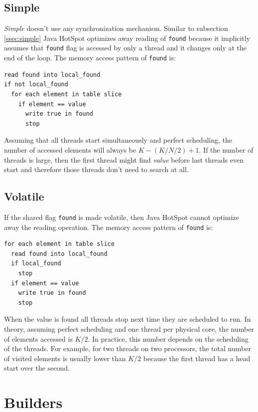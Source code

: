\documentclass[12pt]{article}
\begin{document}
\subsection{Simple}

\emph{Simple} doesn't use any synchronization mechanism. Similar to subsection
\ref{ssec:simple} Java HotSpot optimizes away reading of \texttt{found}
because it implicitly assumes that \texttt{found} flag is accessed by only
a thread and it changes only at the end of the loop. The memory access pattern
of \texttt{found} is:

\begin{verbatim}
read found into local_found
if not local_found
  for each element in table slice
    if element == value
      write true in found 
      stop
\end{verbatim}

Assuming that all threads start simultaneously and perfect scheduling, the
number of accessed elements will always be $K - (K / N / 2) + 1$. If
the number of threads is large, then the first thread might find \emph{value}
before last threads even start and therefore those threads don't need to
search at all.

\subsection{Volatile}

If the shared flag \texttt{found} is made volatile, then Java HotSpot
cannot optimize away the reading operation. The memory access pattern of
\texttt{found} is:

\begin{verbatim}
for each element in table slice
  read found into local_found
  if local_found
    stop
  if element == value
    write true in found 
    stop
\end{verbatim}

When the value is found all threads stop next time they are scheduled to
run. In theory, assuming perfect scheduling and one thread per physical core,
the number of elements accessed is $K / 2$. In practice, this number depends on the
scheduling of the threads. For example, for two threads on two processors,
the total number of visited elements is usually lower than $K / 2$ because
the first thread has a head start over the second.


\newpage
\section{Builders}
\end{document}
